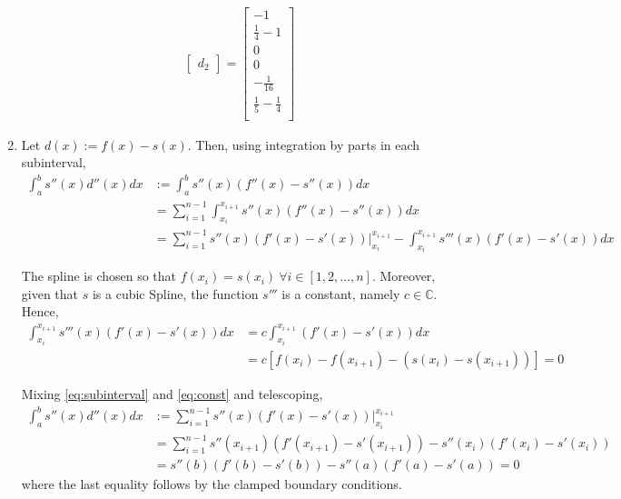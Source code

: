 \documentclass{article}
\begin{document}
\begin{enumerate}[label=(\roman*)]
\begin{align}
\begin{bmatrix}
                d_2
            \end{bmatrix}
            =
            \begin{bmatrix}
                -1 \\
                \frac{1}{4} - 1 \\
                0 \\
                0 \\
                -\frac{1}{16} \\
                \frac{1}{5}-\frac{1}{4} \\
            \end{bmatrix}
        \end{align}
        \item Let $d(x):=f(x)-s(x)$. Then, using integration by parts in each subinterval,
        \begin{align}
            \int_a^b s''(x)d''(x)dx&:=\int_a^b s''(x)(f''(x) - s''(x))dx\\
            &=\sum_{i=1}^{n-1}\int_{x_i}^{x_{i+1}} s''(x)(f''(x) - s''(x))dx \\
            &=\sum_{i=1}^{n-1} s''(x)(f'(x)-s'(x))\bigg\rvert_{x_i}^{x_{i+1}} - \int_{x_i}^{x_{i+1}}  s'''(x)(f'(x) - s'(x))dx
            \label{eq:subinterval}
        \end{align}
        
        The spline is chosen so that $f(x_i)=s(x_i) \ \forall i\in [1,2,\dots, n]$. Moreover, given that $s$ is a cubic Spline, the function $s'''$ is a constant, namely $c\in \mathbb{C}$. Hence, 
        \begin{align}
            \int_{x_i}^{x_{i+1}}  s'''(x)(f'(x) - s'(x))dx &= c \int_{x_i}^{x_{i+1}}(f'(x) - s'(x))dx \\
            &= c[f(x_i)-f(x_{i+1})-(s(x_i)-s(x_{i+1}))]=0
            \label{eq:const}
        \end{align}
        
        Mixing \eqref{eq:subinterval} and \eqref{eq:const} and telescoping,
        \begin{align}
            \int_a^b s''(x)d''(x)dx&:=\sum_{i=1}^{n-1} s''(x)(f'(x)-s'(x))\bigg\rvert_{x_i}^{x_{i+1}} \\
            &= \sum_{i=1}^{n-1} s''(x_{i+1})(f'(x_{i+1})-s'(x_{i+1})) - s''(x_{i})(f'(x_{i})-s'(x_i)) \\
            &=s''(b)(f'(b)-s'(b)) - s''(a)(f'(a)-s'(a)) =0
            \label{eq:0}
        \end{align}
        where the last equality follows by the clamped boundary conditions.
        

\end{enumerate}
\end{document}
